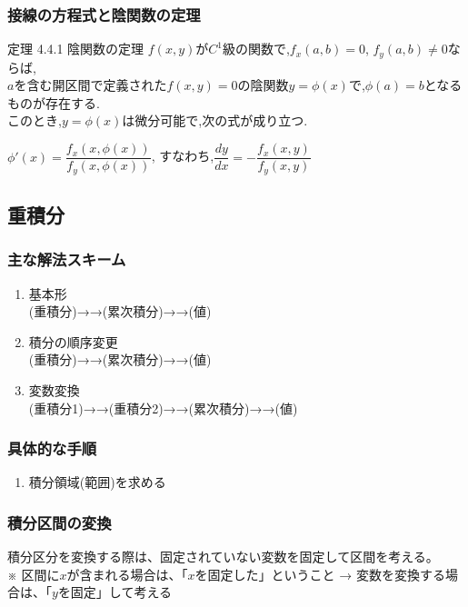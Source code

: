 \documentclass[a4paper]{jsarticle}
\begin{document}
\subsubsection{接線の方程式と陰関数の定理}
\begin{itembox}[l]{定理 4.4.1 陰関数の定理}
    $f\left(x,y\right)$が$C^1$級の関数で,$f_x\left(a,b\right)=0$, $f_y\left(a,b\right)\neq0$ならば,\\
    $a$を含む開区間で定義された$f(x,y)=0$の陰関数$y=\phi\left(x\right)$で,$\phi\left(a\right)=b$となるものが存在する.\\
    このとき,$y=\phi\left(x\right)$は微分可能で,次の式が成り立つ.
    \begin{center}
        $\phi'\left(x\right)=\dfrac{f_x\left(x,\phi\left(x\right)\right)}{f_y\left(x,\phi\left(x\right)\right)}$,
        すなわち,$\dfrac{dy}{dx}=-\dfrac{f_x\left(x,y\right)}{f_y\left(x,y\right)}$
    \end{center}
\end{itembox}
\subsection{重積分}
\subsubsection{主な解法スキーム}
\begin{enumerate}[(1)]
    \item 基本形\\
          (重積分)→→(累次積分)→→(値)
    \item 積分の順序変更\\
          (重積分)→→(累次積分)→→(値)
    \item 変数変換\\
          (重積分1)→→(重積分2)→→(累次積分)→→(値)
\end{enumerate}
\subsubsection{具体的な手順}
\begin{enumerate}[(1)]
    \item 積分領域(範囲)を求める
\end{enumerate}
\subsubsection{積分区間の変換}
積分区分を変換する際は、固定されていない変数を固定して区間を考える。\\
※ 区間に$x$が含まれる場合は、「$x$を固定した」ということ → 変数を変換する場合は、「$y$を固定」して考える
\end{document}
